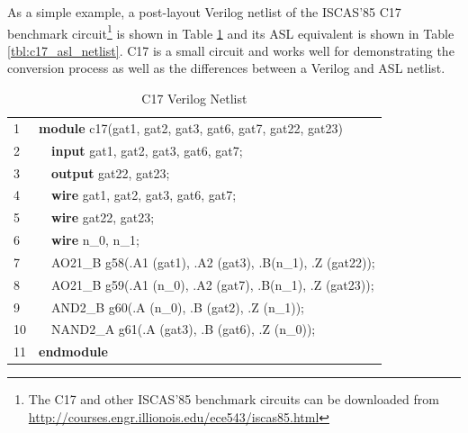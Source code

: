 \documentclass[12pt]{report}
\begin{document}
As a simple example, a post-layout Verilog netlist of the ISCAS'85 C17 benchmark circuit\footnote{The C17 and other ISCAS'85 benchmark circuits can be downloaded from \url{http://courses.engr.illionois.edu/ece543/iscas85.html}} is shown in Table \ref{tbl:c17_verilog_netlist} and its ASL equivalent is shown in Table \ref{tbl:c17_asl_netlist}.  C17 is a small circuit and works well for demonstrating the conversion process as well as the differences between a Verilog and ASL netlist. 
\begin{table}
  \begin{center}
    \caption{C17 Verilog Netlist}
    \begin{tabular}{|l|ll|}
      \hline
      1 & \multicolumn{2}{l|}{\textbf{module} c17(gat1, gat2, gat3, gat6, gat7, gat22, gat23)} \\
      2 & & \textbf{input} gat1, gat2, gat3, gat6, gat7; \\ 
      3 & & \textbf{output} gat22, gat23; \\ 
      4 & & \textbf{wire} gat1, gat2, gat3, gat6, gat7; \\ 
      5 & & \textbf{wire} gat22, gat23; \\ 
      6 & & \textbf{wire} n\_0, n\_1; \\ 
      7 & & AO21\_B g58(.A1 (gat1), .A2 (gat3), .B(n\_1), .Z (gat22)); \\
      8 & & AO21\_B g59(.A1 (n\_0), .A2 (gat7), .B(n\_1), .Z (gat23)); \\
      9 & & AND2\_B g60(.A (n\_0), .B (gat2), .Z (n\_1)); \\ 
      10 & & NAND2\_A g61(.A (gat3), .B (gat6), .Z (n\_0)); \\ 
      11 & \multicolumn{2}{l|}{\textbf{endmodule}} \\ 
      \hline
    \end{tabular}
    \label{tbl:c17_verilog_netlist}
  \end{center}
\end{table}
\end{document}
